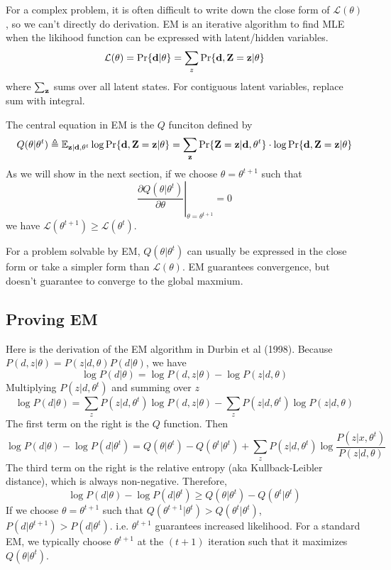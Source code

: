 \documentclass[10pt]{article}
\begin{document}
For a complex problem, it is often difficult to write down the close form of
$\mathcal{L}(\theta)$, so we can't directly do derivation. EM is an iterative
algorithm to find MLE when the likihood function can be expressed with
latent/hidden variables.
$$
\mathcal{L}(\theta)=\Pr\{{\bf d}|\theta\}=\sum_z\Pr\{{\bf d},{\bf Z}={\bf z}|\theta\}
$$
where $\sum_{\bf z}$ sums over all latent states. For contiguous latent
variables, replace sum with integral.

The central equation in EM is the $Q$ funciton defined by
$$
Q(\theta|\theta^t)\triangleq\mathbb{E}_{{\bf z}|{\bf d},\theta^t}\log\Pr\{{\bf d},{\bf Z}={\bf z}|\theta\}=\sum_{{\bf z}}\Pr\{{\bf Z}={\bf z}|{\bf d},\theta^t\}\cdot\log\Pr\{{\bf d},{\bf Z}={\bf z}|\theta\}
$$
As we will show in the next section, if we choose $\theta=\theta^{t+1}$ such that
$$
\left.\frac{\partial Q(\theta|\theta^t)}{\partial\theta}\right|_{\theta=\theta^{t+1}}=0
$$
we have $\mathcal{L}(\theta^{t+1})\ge\mathcal{L}(\theta^t)$.

For a problem solvable by EM, $Q(\theta|\theta^t)$ can usually be expressed in
the close form or take a simpler form than $\mathcal{L}(\theta)$. EM guarantees
convergence, but doesn't guarantee to converge to the global maxmium.

\subsection{Proving EM}

Here is the derivation of the EM algorithm in Durbin et al (1998). Because
$P(d,z|\theta)=P(z|d,\theta)P(d|\theta)$, we have
$$
\log P(d|\theta)=\log P(d,z|\theta)-\log P(z|d,\theta)
$$
Multiplying $P(z|d,\theta^t)$ and summing over $z$
$$
\log P(d|\theta)=\sum_zP(z|d,\theta^t)\log P(d,z|\theta) - \sum_zP(z|d,\theta^t)\log P(z|d,\theta)
$$
The first term on the right is the $Q$ function. Then
$$
\log P(d|\theta)-\log P(d|\theta^t)=Q(\theta|\theta^t)-Q(\theta^t|\theta^t)+\sum_z P(z|d,\theta^t)\log\frac{P(z|x,\theta^t)}{P(z|d,\theta)}
$$
The third term on the right is the relative entropy (aka Kullback-Leibler
distance), which is always non-negative. Therefore,
$$
\log P(d|\theta)-\log P(d|\theta^t)\ge Q(\theta|\theta^t)-Q(\theta^t|\theta^t)
$$
If we choose $\theta=\theta^{t+1}$ such that
$Q(\theta^{t+1}|\theta^t)>Q(\theta^t|\theta^t)$,
$P(d|\theta^{t+1})>P(d|\theta^t)$. i.e. $\theta^{t+1}$ guarantees increased
likelihood. For a standard EM, we typically choose $\theta^{t+1}$ at the $(t+1)$
iteration such that it maximizes $Q(\theta|\theta^t)$.
\end{document}
